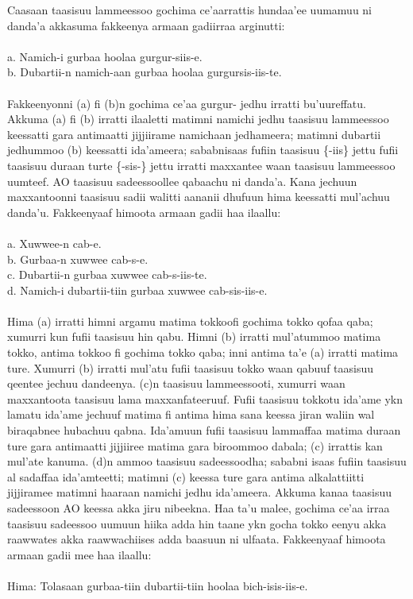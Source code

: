 \documentclass[11pt,b5paper]{book}
\begin{document}
Caasaan taasisuu lammeessoo gochima ce’aarrattis hundaa’ee uumamuu ni danda’a akkasuma fakkeenya armaan gadiirraa arginutti: \\
\\
a. Namich-i gurbaa hoolaa gurgur-siis-e.\\
b. Dubartii-n namich-aan gurbaa hoolaa gurgursis-iis-te.\\
\\
Fakkeenyonni (a) fi (b)n gochima ce’aa gurgur- jedhu irratti bu’uureffatu. Akkuma (a) fi (b) irratti ilaaletti matimni namichi jedhu taasisuu lammeessoo keessatti gara antimaatti jijjiirame
namichaan jedhameera; matimni dubartii jedhummoo (b) keessatti ida’ameera; sababnisaas fufiin taasisuu \{-iis\} jettu fufii taasisuu duraan turte \{-sis-\} jettu irratti maxxantee waan taasisuu lammeessoo uumteef. AO taasisuu sadeessoollee qabaachu ni danda’a. Kana jechuun maxxantoonni taasisuu sadii walitti aananii dhufuun hima keessatti mul’achuu danda’u. Fakkeenyaaf himoota armaan gadii haa ilaallu: \\
\\
a. Xuwwee-n cab-e.\\
b. Gurbaa-n xuwwee cab-s-e.\\
c. Dubartii-n gurbaa xuwwee cab-s-iis-te.\\
d. Namich-i dubartii-tiin gurbaa xuwwee cab-sis-iis-e. \\
\\
Hima (a) irratti himni argamu matima tokkoofi gochima tokko qofaa qaba; xumurri kun fufii taasisuu hin qabu. Himni (b) irratti mul’atummoo matima tokko, antima tokkoo fi gochima tokko qaba; inni antima ta’e (a) irratti matima ture. Xumurri (b) irratti mul’atu fufii taasisuu tokko waan qabuuf taasisuu
qeentee jechuu dandeenya. (c)n taasisuu lammeessooti, xumurri waan maxxantoota taasisuu lama maxxanfateeruuf. Fufii taasisuu tokkotu ida’ame ykn lamatu ida’ame jechuuf matima fi antima hima sana keessa jiran waliin wal biraqabnee hubachuu qabna. Ida’amuun fufii taasisuu lammaffaa matima
duraan ture gara antimaatti jijjiiree matima gara biroommoo dabala; (c) irrattis kan mul’ate kanuma. (d)n ammoo taasisuu sadeessoodha; sababni isaas fufiin taasisuu al sadaffaa ida’amteetti; matimni (c) keessa ture gara antima alkalattiitti jijjiramee matimni haaraan namichi jedhu ida’ameera. Akkuma
kanaa taasisuu sadeessoon AO keessa akka jiru nibeekna. Haa ta’u malee, gochima ce’aa irraa taasisuu sadeessoo uumuun hiika adda hin taane ykn gocha tokko eenyu akka raawwates akka raawwachiises adda baasuun ni ulfaata. Fakkeenyaaf himoota armaan gadii mee haa ilaallu: \\
\\
Hima: Tolasaan gurbaa-tiin dubartii-tiin hoolaa bich-isis-iis-e.\\
\\
\end{document}
